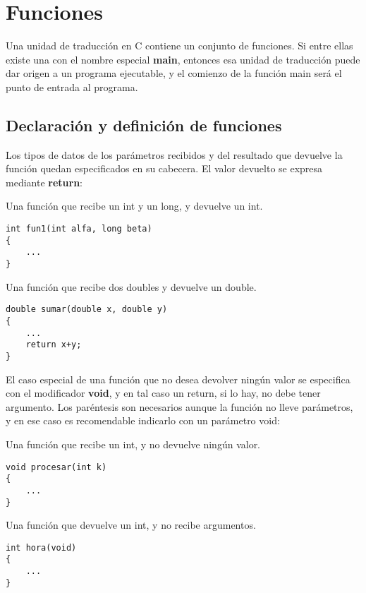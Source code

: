 



\chapter{Funciones}

Una unidad de traducción en C contiene un conjunto de funciones. Si entre ellas
existe una con el nombre especial \textbf{main}, entonces esa unidad de traducción puede
dar origen a un programa ejecutable, y el comienzo de la función main será el
punto de entrada al programa.

\section{Declaración y definición de funciones} 

Los tipos de datos de los parámetros recibidos y del resultado que devuelve la
función quedan especificados en su cabecera. El valor devuelto se expresa
mediante \textbf{return}:

\begin{ejemplo}
Una función que recibe un int y un long, y devuelve un int.
\begin{lstlisting}
int fun1(int alfa, long beta)
{
	...
}	
\end{lstlisting}

Una función que recibe dos doubles y devuelve un double.
\begin{lstlisting}
double sumar(double x, double y)
{
	...
	return x+y;
}	
\end{lstlisting}
\end{ejemplo}

El caso especial de una función que no desea devolver ningún valor se
especifica con el modificador \textbf{void}, y en tal caso un return, si lo hay, no debe
tener argumento. Los paréntesis son necesarios aunque la función no lleve
parámetros, y en ese caso es recomendable indicarlo con un parámetro void:

\begin{ejemplo}
Una función que recibe un int, y no devuelve ningún valor.
\begin{lstlisting}
void procesar(int k)
{
	...
}	
\end{lstlisting}

Una función que devuelve un int, y no recibe argumentos.
\begin{lstlisting}
int hora(void)
{
	...
}	
\end{lstlisting}
\end{ejemplo}

